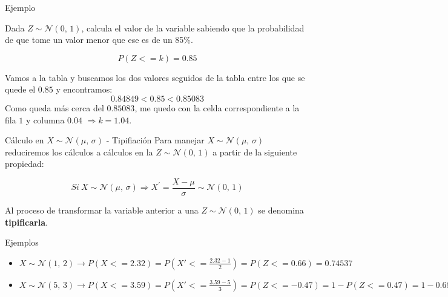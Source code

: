 \documentclass[11pt,handout]{beamer}
\begin{document}
\begin{frame}{Ejemplo}

Dada $Z \sim \mathcal{N}(0,\,1)$, calcula el valor de la variable sabiendo que la probabilidad de que tome un valor menor que ese es de un 85\%. 

$$P(Z<=k)=0.85$$
    \begin{center}
        
    \end{center}

Vamos a la tabla y buscamos los dos valores seguidos de la tabla entre los que se quede el $0.85$ y encontramos:
$$0.84849 < 0.85 < 0.85083 $$
Como queda más cerca del $0.85083$, me quedo con la celda correspondiente a la fila $1$ y columna $0.04$  $\Rightarrow k=1.04$.
\end{frame}

\begin{frame}{Cálculo en $X \sim \mathcal{N}(\mu,\,\sigma)$ - Tipifiación}
Para manejar $X \sim \mathcal{N}(\mu,\,\sigma)$ reduciremos los cálculos a cálculos en la $Z \sim \mathcal{N}(0,\,1)$ a partir de la siguiente propiedad:

\begin{block}{}
$$ Si \  X \sim \mathcal{N}(\mu,\,\sigma) \Rightarrow X^{'}=\frac{X - \mu}{\sigma} \sim \mathcal{N}(0,\,1) $$
\end{block}

\pause

Al proceso de transformar la variable anterior a una $Z\sim \mathcal{N}(0,\,1)$ se denomina \textbf{tipificarla}.


\end{frame}



\begin{frame}{Ejemplos}

\begin{itemize}[<+->]
    \item $X \sim \mathcal{N}(1,\,2) \to P(X<=2.32)=P(X'<=\frac{2.32-1}{2})=P(Z<=0.66)=0.74537$
    \item $X \sim \mathcal{N}(5,\,3) \to P(X<=3.59)=P(X'<=\frac{3.59-5}{3})=P(Z<=-0.47)=1-P(Z<=0.47)=1-0.68082=0.31918$
\end{itemize}
\end{frame}
\end{document}
